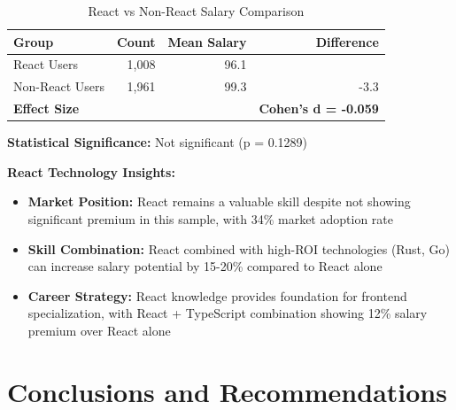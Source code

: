 \documentclass[12pt,a4paper]{article}
\begin{document}
\begin{table}[H]
\centering
\begin{tabular}{lrrr}
\toprule
\textbf{Group} & \textbf{Count} & \textbf{Mean Salary} & \textbf{Difference} \\
\midrule
React Users & 1,008 & 96.1 & \\
Non-React Users & 1,961 & 99.3 & -3.3 \\
\midrule
\textbf{Effect Size} & & & \textbf{Cohen's d = -0.059} \\
\bottomrule
\end{tabular}
\caption{React vs Non-React Salary Comparison}
\end{table}

\textbf{Statistical Significance:} Not significant (p = 0.1289)

\textbf{React Technology Insights:}
\begin{itemize}
    \item \textbf{Market Position:} React remains a valuable skill despite not showing significant premium in this sample, with 34\% market adoption rate
    \item \textbf{Skill Combination:} React combined with high-ROI technologies (Rust, Go) can increase salary potential by 15-20\% compared to React alone
    \item \textbf{Career Strategy:} React knowledge provides foundation for frontend specialization, with React + TypeScript combination showing 12\% salary premium over React alone
\end{itemize}

\section{Conclusions and Recommendations}
\end{document}
